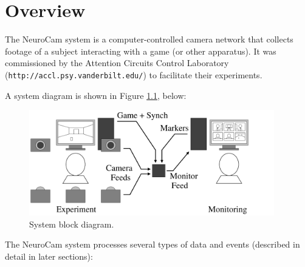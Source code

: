 
\chapter{Overview}
\label{intro}

The NeuroCam system is a computer-controlled camera network that collects
footage of a subject interacting with a game (or other apparatus).
It was commissioned by the Attention Circuits Control Laboratory
(\verb+http://accl.psy.vanderbilt.edu/+)
to facilitate their experiments.

A system diagram is shown in Figure \ref{fig-system}, below:

\begin{figure}[h]
\begin{center}
\includegraphics[width=0.95\textwidth]{figs/system-ext.pdf}
\end{center}
\caption{System block diagram.}\label{fig-system}
\end{figure}

The NeuroCam system processes several types of data and events (described
in detail in later sections):


